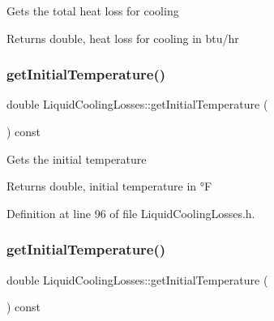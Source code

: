 Gets the total heat loss for cooling

\begin{DoxyReturn}{Returns}
double, heat loss for cooling in btu/hr 
\end{DoxyReturn}
\mbox{\label{class_liquid_cooling_losses_a4cfb23800b80e99858bbc5c3ef5169eb}} 
\subsubsection{\texorpdfstring{get\+Initial\+Temperature()}{getInitialTemperature()}\hspace{0.1cm}{\footnotesize\ttfamily [1/3]}}
{\footnotesize\ttfamily double Liquid\+Cooling\+Losses\+::get\+Initial\+Temperature (\begin{DoxyParamCaption}{ }\end{DoxyParamCaption}) const\hspace{0.3cm}{\ttfamily [inline]}}

Gets the initial temperature

\begin{DoxyReturn}{Returns}
double, initial temperature in °F 
\end{DoxyReturn}


Definition at line 96 of file Liquid\+Cooling\+Losses.\+h.

\mbox{\label{class_liquid_cooling_losses_a4cfb23800b80e99858bbc5c3ef5169eb}} 
\subsubsection{\texorpdfstring{get\+Initial\+Temperature()}{getInitialTemperature()}\hspace{0.1cm}{\footnotesize\ttfamily [2/3]}}
{\footnotesize\ttfamily double Liquid\+Cooling\+Losses\+::get\+Initial\+Temperature (\begin{DoxyParamCaption}{ }\end{DoxyParamCaption}) const\hspace{0.3cm}{\ttfamily [inline]}}

